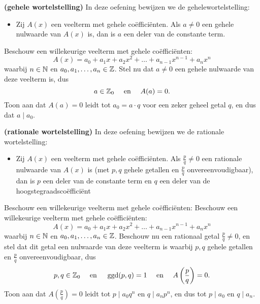 \documentclass{ximera}
\begin{document}
\begin{Uitbreiding}
\begin{exercise}
{\bf (gehele wortelstelling)} 
In deze oefening bewijzen we de gehelewortelstelling: 
\begin{itemize}
\item[]
Zij $A(x)$ een veelterm met gehele coëfficiënten. Als $a \neq 0$ een gehele nulwaarde van $A(x)$ is, dan is $a$ een deler van de constante term.
\end{itemize}
Beschouw een willekeurige veelterm met gehele coëfficiënten:
\[
A(x) = a_0 + a_1 x + a_2 x^2 + \dots + a_{n-1} x^{n-1} + a_nx^n
\]
waarbij $ n \in \mathbb{N}$ en $a_0, a_1, \ldots, a_n \in \mathbb{Z}$. Stel nu dat $a \neq 0$ een gehele nulwaarde van deze veelterm is, dus
\[
a \in \mathbb{Z}_0 \quad \text{ en } \quad A(a) = 0.
\]
Toon aan dat $A(a) = 0$ leidt tot $a_0 = a\cdot q$ voor een zeker geheel getal $q$, en dus dat $a \mid a_0$. 
\end{exercise}
\end{Uitbreiding}


\begin{Uitbreiding}
\begin{exercise}\label{oefening:rationalewortelstelling}
{\bf (rationale wortelstelling)} 
In deze oefening bewijzen we de rationale wortelstelling:
\begin{itemize}
\item[]
Zij $A(x)$ een veelterm met gehele coëfficiënten. Als $\frac{p}{q} \neq 0$ een rationale nulwaarde van $A(x)$ is (met $p,q$ gehele getallen en $\frac{p}{q}$ onvereenvoudigbaar), dan is $p$ een deler van de constante term en $q$ een deler van de hoogstegraadscoëfficiënt  
\end{itemize}
Beschouw een willekeurige veelterm met gehele coëfficiënten:
Beschouw een willekeurige veelterm met gehele coëfficiënten:
\[
A(x) = a_0 + a_1 x + a_2 x^2 + \dots + a_{n-1} x^{n-1} + a_nx^n
\]
waarbij $ n \in \mathbb{N}$ en $a_0, a_1, \ldots, a_n \in \mathbb{Z}$. Beschouw nu een rationaal getal $\frac{p}{q} \neq 0$, en stel dat dit getal een nulwaarde van deze veelterm is waarbij $p,q$ gehele getallen en $\frac{p}{q}$ onvereenvoudigbaar, dus
\[
p,q \in \mathbb{Z}_0 \quad \text{ en } \quad \operatorname{ggd}(p,q)=1 \quad \text{ en } \quad A\left(\frac{p}{q}\right) = 0.
\]
Toon aan dat $A\left(\frac{p}{q}\right) = 0$ leidt tot $p \mid a_0q^n$ en $q \mid a_n p^n$, en dus tot $p \mid a_0$ en $q \mid a_n$.
\end{exercise}
\end{Uitbreiding}
\end{document}
